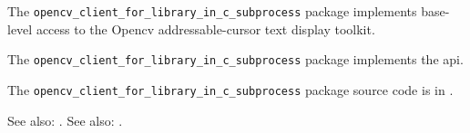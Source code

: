
The {\tt opencv\_client\_for\_library\_in\_c\_subprocess} package implements base-level access to the Opencv addressable-cursor
text display toolkit.

The {\tt opencv\_client\_for\_library\_in\_c\_subprocess} package implements the  api.

The {\tt opencv\_client\_for\_library\_in\_c\_subprocess} package source code is in .

See also:  .
See also:  .


